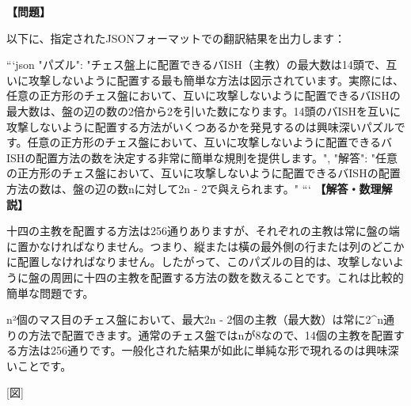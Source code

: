 \documentclass[10pt,a4paper,oneside,openany]{ltjsbook}
\begin{document}
\begin{tcolorbox}[colback=softblue,colframe=primaryblue,title=\textbf{第 299 問：BISHOPS IN CONVOCATION.},arc=2mm,boxrule=1pt,breakable]
\textbf{【問題】}\par\vspace{0.3em}
以下に、指定されたJSONフォーマットでの翻訳結果を出力します：

```json
{
  "パズル": "チェス盤上に配置できるバISH（主教）の最大数は14頭で、互いに攻撃しないように配置する最も簡単な方法は図示されています。実際には、任意の正方形のチェス盤において、互いに攻撃しないように配置できるバISHの最大数は、盤の辺の数の2倍から2を引いた数になります。14頭のバISHを互いに攻撃しないように配置する方法がいくつあるかを発見するのは興味深いパズルです。任意の正方形のチェス盤において、互いに攻撃しないように配置できるバISHの配置方法の数を決定する非常に簡単な規則を提供します。",
  "解答": "任意の正方形のチェス盤において、互いに攻撃しないように配置できるバISHの配置方法の数は、盤の辺の数nに対して2n - 2で與えられます。"
}
```
\tcblower
\textbf{【解答・数理解説】}\par\vspace{0.3em}
十四の主教を配置する方法は256通りありますが、それぞれの主教は常に盤の端に置かなければなりません。つまり、縦または橫の最外側の行または列のどこかに配置しなければなりません。したがって、このパズルの目的は、攻撃しないように盤の周囲に十四の主教を配置する方法の数を数えることです。これは比較的簡単な問題です。

n²個のマス目のチェス盤において、最大2n - 2個の主教（最大数）は常に2\textasciicircum{}n通りの方法で配置できます。通常のチェス盤ではnが8なので、14個の主教を配置する方法は256通りです。一般化された結果が如此に単純な形で現れるのは興味深いことです。

[図]
\end{tcolorbox}
\end{document}
